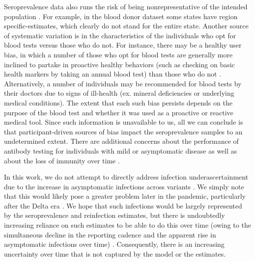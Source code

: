 \documentclass{article}
\begin{document}
Seroprevalence data also runs the risk of being nonrepresentative of the
intended population \citep{bajema2021estimated}. For example, in the blood donor
dataset some states have region specific-estimates, which clearly do not stand
for the entire state. Another source of systematic variation is in the
characteristics of the individuals who opt for blood tests versus those who do
not. For instance, there may be a healthy user bias, in which a number of those
who opt for blood tests are generally more inclined to partake in proactive
healthy behaviors (such as checking on basic health markers by taking an annual
blood test) than those who do not \citep{parsley2018blood}. Alternatively, a
number of individuals may be recommended for blood tests by their doctors due to
signs of ill-health (ex. mineral deficiencies or underlying medical
conditions). The extent that each such bias persists depends on the purpose of
the blood test and whether it was used as a proactive or reactive medical tool.
Since such information is unavailable to us, all we can conclude is that
participant-driven sources of bias impact the seroprevalence samples to an
undetermined extent. There are additional concerns about the performance of
antibody testing for individuals with mild or asymptomatic disease as well as about
the loss of immunity over time \citep{kaku2021performance, seow2020longitudinal,
ibarrondo2020rapid}.

In this work, we do not attempt to directly address infection underascertainment
due to the increase in asymptomatic infections across variants
\citep{pho2023covid19}. We simply note that this would likely pose a greater
problem later in the pandemic, particularly after the Delta era
\citep{fan2022sars}. We hope that such infections would be largely represented
by the seroprevalence and reinfection estimates, but there is undoubtedly
increasing reliance on such estimates to be able to do this over time (owing to
the simultaneous decline in the reporting cadence and the apparent rise in
asymptomatic infections over time) \citep{oph2022covid, garrett2022high,
blauer2022reduce, ren2021asymptomatic}. Consequently, there is an increasing
uncertainty over time that is not captured by the model or the estimates.   
\end{document}
